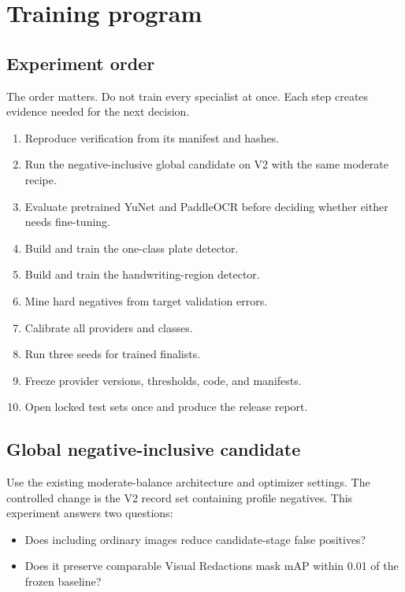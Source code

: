 \chapter{Training program}

\section{Experiment order}

The order matters. Do not train every specialist at once. Each step creates evidence needed for the next decision.

\begin{enumerate}[leftmargin=7mm]
  \item Reproduce  verification from its manifest and hashes.
  \item Run the negative-inclusive global candidate on V2 with the same moderate recipe.
  \item Evaluate pretrained YuNet and PaddleOCR before deciding whether either needs fine-tuning.
  \item Build and train the one-class plate detector.
  \item Build and train the handwriting-region detector.
  \item Mine hard negatives from target validation errors.
  \item Calibrate all providers and classes.
  \item Run three seeds for trained finalists.
  \item Freeze provider versions, thresholds, code, and manifests.
  \item Open locked test sets once and produce the release report.
\end{enumerate}

\section{Global negative-inclusive candidate}

Use the existing moderate-balance architecture and optimizer settings. The controlled change is the V2 record set containing profile negatives. This experiment answers two questions:

\begin{itemize}[leftmargin=6mm]
  \item Does including ordinary images reduce candidate-stage false positives?
  \item Does it preserve comparable Visual Redactions mask mAP within 0.01 of the frozen baseline?
\end{itemize}

